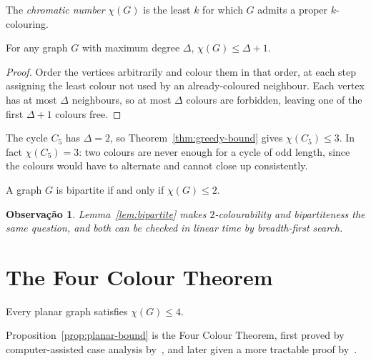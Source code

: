 \documentclass[lang=en,12pt]{beautybook}
\newtheorem*{remark}{\textbf{Observação}}
\begin{document}
\begin{defi}
\label{def:chromatic}
The \emph{chromatic number} $\chi(G)$ is the least $k$ for which $G$
admits a proper $k$-colouring.
\end{defi}

\begin{thm}
\label{thm:greedy-bound}
For any graph $G$ with maximum degree $\Delta$, $\chi(G) \leq \Delta + 1$.
\end{thm}

\begin{proof}
Order the vertices arbitrarily and colour them in that order, at each step
assigning the least colour not used by an already-coloured neighbour.
Each vertex has at most $\Delta$ neighbours, so at most $\Delta$ colours
are forbidden, leaving one of the first $\Delta + 1$ colours free.
\end{proof}

\begin{exam}
\label{exam:cycle}
The cycle $C_5$ has $\Delta = 2$, so Theorem~\ref{thm:greedy-bound} gives
$\chi(C_5) \leq 3$. In fact $\chi(C_5) = 3$: two colours are never enough
for a cycle of odd length, since the colours would have to alternate and
cannot close up consistently.
\end{exam}

\begin{lem}
\label{lem:bipartite}
A graph $G$ is bipartite if and only if $\chi(G) \leq 2$.
\end{lem}

\begin{remark}
Lemma~\ref{lem:bipartite} makes $2$-colourability and bipartiteness the
same question, and both can be checked in linear time by breadth-first
search.
\end{remark}

\chapter{The Four Colour Theorem}
\label{ch:four-colour}

\begin{prop}
\label{prop:planar-bound}
Every planar graph satisfies $\chi(G) \leq 4$.
\end{prop}

Proposition~\ref{prop:planar-bound} is the Four Colour Theorem, first
proved by computer-assisted case analysis
by~\citet{appel1977four}, and later given a more tractable
proof by~\citet{robertson1997four}.



\end{document}
